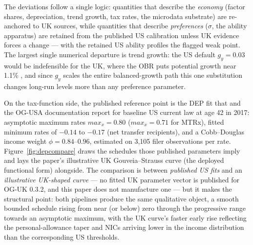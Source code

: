 The deviations follow a single logic: quantities that describe the \emph{economy} (factor shares, depreciation, trend growth, tax rates, the microdata substrate) are re-anchored to UK sources, while quantities that describe \emph{preferences} ($\sigma$, the ability apparatus) are retained from the published US calibration unless UK evidence forces a change --- with the retained US ability profiles the flagged weak point. The largest single numerical departure is trend growth: the US default $g_y = 0.03$ would be indefensible for the UK, where the OBR puts potential growth near 1.1\% \citep{OBR2025EFO}, and since $g_y$ scales the entire balanced-growth path this one substitution changes long-run levels more than any preference parameter.

On the tax-function side, the published reference point is the DEP fit that \citet{DeBackerEvansPhillips2019} and the OG-USA documentation report for baseline US current law at age 42 in 2017: asymptotic maximum rates $max_x = 0.80$ ($max_x = 0.71$ for MTRx), fitted minimum rates of $-0.14$ to $-0.17$ (net transfer recipients), and a Cobb--Douglas income weight $\phi = 0.84$--$0.96$, estimated on 3{,}105 filer observations per rate. Figure~\ref{fig:depcompare} draws the schedules those published parameters imply and lays the paper's illustrative UK Gouveia--Strauss curve (the deployed functional form) alongside. The comparison is between \emph{published US fits} and an \emph{illustrative UK-shaped curve} --- no fitted UK parameter vector is published for OG-UK 0.3.2, and this paper does not manufacture one --- but it makes the structural point: both pipelines produce the same qualitative object, a smooth bounded schedule rising from near (or below) zero through the progressive range towards an asymptotic maximum, with the UK curve's faster early rise reflecting the personal-allowance taper and NICs arriving lower in the income distribution than the corresponding US thresholds.

